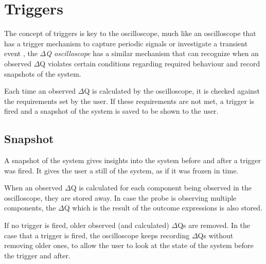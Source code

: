 \section{Triggers}
    The concept of triggers is key to the oscilloscope, much like an oscilloscope that has a trigger mechanism to capture periodic signals or investigate a transient event \cite{osc-t}, the \textit{$\Delta$Q oscilloscope} has a similar mechanism that can recognize when an observed $\Delta$Q violates certain conditions regarding required behaviour and record snapshots of the system.

    Each time an observed $\Delta$Q is calculated by the oscilloscope, it is checked against the requirements set by the user. If these requirements are not met, a trigger is fired and a snapshot of the system is saved to be shown to the user. 
    
    \subsection{Snapshot}
    A snapshot of the system gives insights into the system before and after a trigger was fired. It gives the user a still of the system, as if it was frozen in time.

When an observed $\Delta$Q is calculated for each component being observed in the oscilloscope, they are stored away. In case the probe is observing multiple components, the $\Delta$Q which is the result of the outcome expressions is also stored.

If no trigger is fired, older observed (and calculated) $\Delta$Qs are removed. In the case that a trigger is fired, the oscilloscope keeps recording $\Delta$Qs without removing older ones, to allow the user to look at the state of the system before the trigger and after.
    

